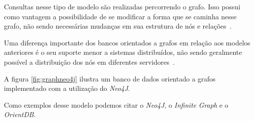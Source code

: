 Consultas nesse tipo de modelo são realizadas percorrendo o grafo. Isso possui como vantagem a possibilidade de se modificar a forma que se caminha nesse grafo, não sendo necessárias mudanças em sua estrutura de nós e relações~\cite{pramod}.

Uma diferença importante dos bancos orientados a grafos em relação aos modelos anteriores é o seu suporte menor a sistemas distribuídos, não sendo geralmente possível a distribuição dos nós em diferentes servidores~\cite{pramod}.

A figura \ref{fig:graphneo4j} ilustra um banco de dados orientado a grafos implementado com a utilização do \emph{Neo4J}.

Como exemplos desse modelo podemos citar o \emph{Neo4J}, o \emph{Infinite Graph} e o \emph{OrientDB}.

